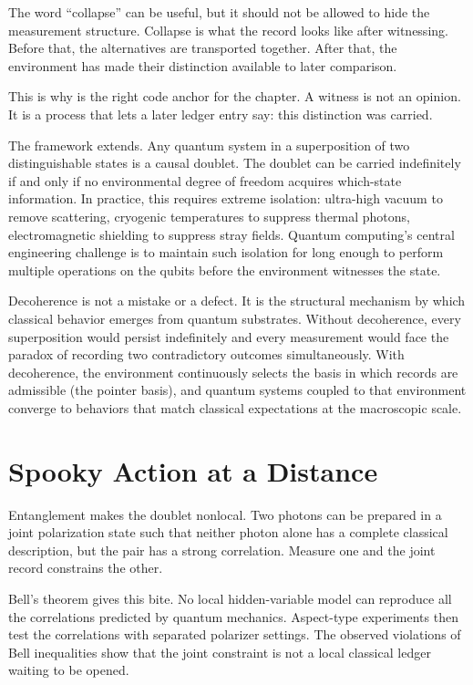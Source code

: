The word ``collapse'' can be useful, but it should not be allowed to hide
the measurement structure. Collapse is what the record looks like after
witnessing. Before that, the alternatives are transported together.
After that, the environment has made their distinction available to
later comparison.

This is why  is the right code anchor for the chapter. A
witness is not an opinion. It is a process that lets a later ledger entry
say: this distinction was carried.

The framework extends. Any quantum system in a superposition of two
distinguishable states is a causal doublet. The doublet can be carried
indefinitely if and only if no environmental degree of freedom acquires
which-state information. In practice, this requires extreme isolation:
ultra-high vacuum to remove scattering, cryogenic temperatures to
suppress thermal photons, electromagnetic shielding to suppress stray
fields. Quantum computing's central engineering challenge is to maintain
such isolation for long enough to perform multiple operations on the
qubits before the environment witnesses the state.

Decoherence is not a mistake or a defect. It is the structural mechanism
by which classical behavior emerges from quantum substrates. Without
decoherence, every superposition would persist indefinitely and every
measurement would face the paradox of recording two contradictory
outcomes simultaneously. With decoherence, the environment continuously
selects the basis in which records are admissible (the pointer basis),
and quantum systems coupled to that environment converge to behaviors
that match classical expectations at the macroscopic scale.

\section{Spooky Action at a Distance}
\label{se:spooky-action-at-a-distance}

Entanglement makes the doublet nonlocal. Two photons can be prepared in a joint
polarization state such that neither photon alone has a complete classical
description, but the pair has a strong correlation. Measure one and the joint
record constrains the other.

Bell's theorem gives this bite. No local hidden-variable model can reproduce
all the correlations predicted by quantum mechanics. Aspect-type experiments
then test the correlations with separated polarizer settings. The observed
violations of Bell inequalities show that the joint constraint is not a local
classical ledger waiting to be opened.

